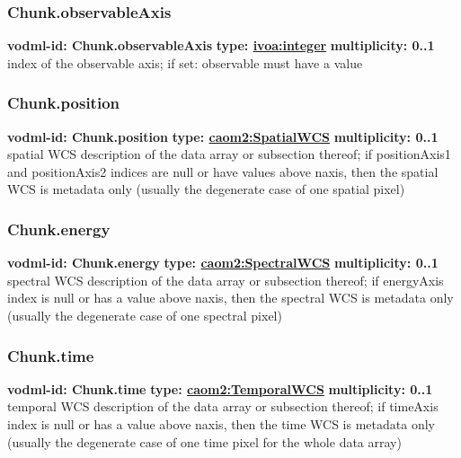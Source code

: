     \subsubsection{Chunk.observableAxis}
      \textbf{vodml-id: Chunk.observableAxis} \newline
      \textbf{type: \hyperref[sect:ivoa]{ivoa:integer}} \newline
      \textbf{multiplicity: 0..1} \newline
      index of the observable axis; if set: observable must have a value

    \subsubsection{Chunk.position}
      \textbf{vodml-id: Chunk.position} \newline
      \textbf{type: \hyperref[sect:SpatialWCS]{caom2:SpatialWCS}} \newline
      \textbf{multiplicity: 0..1} \newline
      spatial WCS description of the data array or subsection thereof; if positionAxis1 and positionAxis2 indices are null or have values above {naxis}, then the spatial WCS is metadata only (usually the degenerate case of one spatial pixel)

    \subsubsection{Chunk.energy}
      \textbf{vodml-id: Chunk.energy} \newline
      \textbf{type: \hyperref[sect:SpectralWCS]{caom2:SpectralWCS}} \newline
      \textbf{multiplicity: 0..1} \newline
      spectral WCS description of the data array or subsection thereof; if energyAxis index is null or has a value above {naxis}, then the spectral WCS is metadata only (usually the degenerate case of one spectral pixel)

    \subsubsection{Chunk.time}
      \textbf{vodml-id: Chunk.time} \newline
      \textbf{type: \hyperref[sect:TemporalWCS]{caom2:TemporalWCS}} \newline
      \textbf{multiplicity: 0..1} \newline
      temporal WCS description of the data array or subsection thereof; if timeAxis index is null or has a value above {naxis}, then the time WCS is metadata only (usually the degenerate case of one time pixel for the whole data array)

